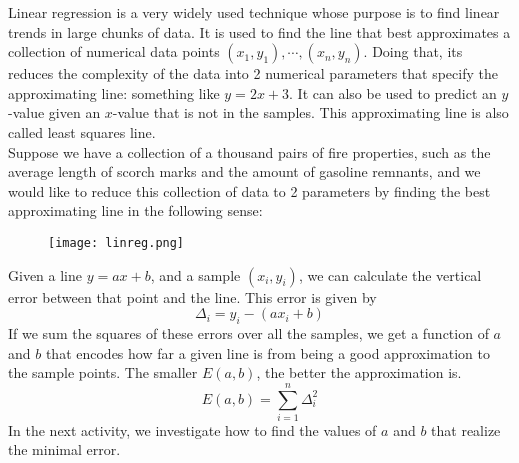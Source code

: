 
Linear regression is a very widely used technique whose purpose is to find linear trends in large chunks of data. It is used to find the line that best approximates a collection of numerical data points $(x_1, y_1),\cdots, (x_n, y_n)$. Doing that, its reduces the complexity of the data into 2 numerical parameters that specify the approximating line: something like $y=2x+3$. It can also be used to predict an $y$-value given an $x$-value that is not in the samples. This approximating line is also called least squares line. \\

Suppose we have a collection of a thousand pairs of fire properties, such as the average length of scorch marks and the amount of gasoline remnants, and we would like to reduce this collection of data to 2 parameters by finding the best approximating line in the following sense: \\

\begin{figure}[H]
   \centering
   \texttt{[image: linreg.png]} 
\end{figure}

Given a line $y=ax+b$, and a sample $(x_i,y_i)$, we can calculate the vertical error between that point and the line. This error is given by
\[
\Delta_i= y_i - (ax_i+b)
\]
If we sum the squares of these errors over all the samples, we get a function of $a$ and $b$ that encodes how far a given line is from being a good approximation to the sample points. The smaller $E(a,b)$, the better the approximation is.
\[
E(a,b)= \sum_{i=1}^n \Delta_i^2
\]
In the next activity, we investigate how to find the values of $a$ and $b$ that realize the minimal error. \\

